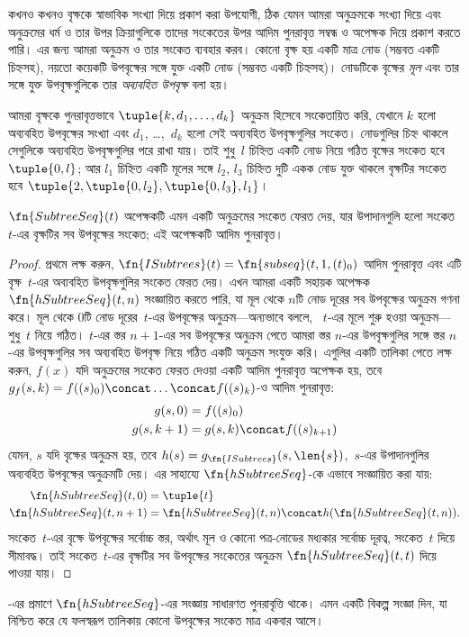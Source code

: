 \documentclass[../../../include/open-logic-section]{subfiles}
\begin{document}

কখনও কখনও বৃক্ষকে স্বাভাবিক সংখ্যা দিয়ে প্রকাশ করা উপযোগী, ঠিক যেমন
আমরা অনুক্রমকে সংখ্যা দিয়ে এবং অনুক্রমের ধর্ম ও তার উপর ক্রিয়াগুলিকে
তাদের সংকেতের উপর আদিম পুনরাবৃত্ত সম্বন্ধ ও অপেক্ষক দিয়ে প্রকাশ করতে
পারি। এর জন্য আমরা অনুক্রম ও তার সংকেত ব্যবহার করব। কোনো বৃক্ষ হয় একটি
মাত্র নোড (সম্ভবত একটি চিহ্নসহ), নয়তো কয়েকটি উপবৃক্ষের সঙ্গে যুক্ত একটি
নোড (সম্ভবত একটি চিহ্নসহ)। নোডটিকে বৃক্ষের \emph{মূল} এবং তার সঙ্গে যুক্ত
উপবৃক্ষগুলিকে তার \emph{অব্যবহিত উপবৃক্ষ} বলা হয়।

আমরা বৃক্ষকে পুনরাবৃত্তভাবে $\tuple{k, d_1, \dots, d_k}$ অনুক্রম হিসেবে
সংকেতায়িত করি, যেখানে $k$ হলো অব্যবহিত উপবৃক্ষের সংখ্যা এবং $d_1$,
\dots,~$d_k$ হলো সেই অব্যবহিত উপবৃক্ষগুলির সংকেত। নোডগুলির চিহ্ন থাকলে
সেগুলিকে অব্যবহিত উপবৃক্ষগুলির পরে রাখা যায়। তাই শুধু~$l$ চিহ্নিত একটি
নোড নিয়ে গঠিত বৃক্ষের সংকেত হবে $\tuple{0,l}$; আর $l_1$ চিহ্নিত একটি
মূলের সঙ্গে $l_2$, $l_3$ চিহ্নিত দুটি একক নোড যুক্ত থাকলে বৃক্ষটির সংকেত
হবে $\tuple{2, \tuple{0, l_2}, \tuple{0, l_3}, l_1}$।

\begin{prop}
  $\fn{SubtreeSeq}(t)$ অপেক্ষকটি এমন একটি অনুক্রমের সংকেত ফেরত দেয়,
  যার উপাদানগুলি হলো সংকেত~$t$-এর বৃক্ষটির সব উপবৃক্ষের সংকেত; এই
  অপেক্ষকটি আদিম পুনরাবৃত্ত।
\end{prop}

\begin{proof}
  প্রথমে লক্ষ করুন, $\fn{ISubtrees}(t) = \fn{subseq}(t, 1, (t)_0)$
  আদিম পুনরাবৃত্ত এবং এটি বৃক্ষ~$t$-এর অব্যবহিত উপবৃক্ষগুলির সংকেত ফেরত
  দেয়। এখন আমরা একটি সহায়ক অপেক্ষক $\fn{hSubtreeSeq}(t,n)$ সংজ্ঞায়িত
  করতে পারি, যা মূল থেকে $n$টি নোড দূরের সব উপবৃক্ষের অনুক্রম গণনা করে।
  মূল থেকে $0$টি নোড দূরের~$t$-এর উপবৃক্ষের অনুক্রম—অন্যভাবে বললে,
  ~$t$-এর মূলে শুরু হওয়া অনুক্রম—শুধু~$t$ নিয়ে গঠিত। $t$-এর স্তর
  $n+1$-এর সব উপবৃক্ষের অনুক্রম পেতে আমরা স্তর $n$-এর উপবৃক্ষগুলির
  সঙ্গে স্তর $n$-এর উপবৃক্ষগুলির সব অব্যবহিত উপবৃক্ষ নিয়ে গঠিত একটি
  অনুক্রম সংযুক্ত করি। এগুলির একটি তালিকা পেতে লক্ষ করুন, $f(x)$ যদি
  অনুক্রমের সংকেত ফেরত দেওয়া একটি আদিম পুনরাবৃত্ত অপেক্ষক হয়, তবে
  $g_f(s, k) = f((s)_0) \concat \dots \concat f((s)_k)$-ও আদিম
  পুনরাবৃত্ত:
    \begin{align*}
      g(s, 0) & = f((s)_0)\\
      g(s, k+1) & = g(s, k) \concat f((s)_{k+1})
    \end{align*}
    যেমন, $s$ যদি বৃক্ষের অনুক্রম হয়, তবে $h(s) =
    g_{\fn{ISubtrees}}(s, \len{s})$,~$s$-এর উপাদানগুলির অব্যবহিত
    উপবৃক্ষের অনুক্রমটি দেয়। এর সাহায্যে $\fn{hSubtreeSeq}$-কে
    এভাবে সংজ্ঞায়িত করা যায়:
    \begin{align*}
      \fn{hSubtreeSeq}(t, 0) & = \tuple{t} \\
      \fn{hSubtreeSeq}(t, n+1) & = \fn{hSubtreeSeq}(t, n) \concat
      h(\fn{hSubtreeSeq}(t, n)).
    \end{align*}
    সংকেত~$t$-এর বৃক্ষে উপবৃক্ষের সর্বোচ্চ স্তর, অর্থাৎ মূল ও কোনো
    পত্র-নোডের মধ্যকার সর্বোচ্চ দূরত্ব, সংকেত~$t$ দিয়ে সীমাবদ্ধ। তাই
    সংকেত~$t$-এর বৃক্ষটির সব উপবৃক্ষের সংকেতের অনুক্রম
    $\fn{hSubtreeSeq}(t, t)$ দিয়ে পাওয়া যায়।
\end{proof}

\begin{prob}
  -এর প্রমাণে
  $\fn{hSubtreeSeq}$-এর সংজ্ঞায় সাধারণত পুনরাবৃত্তি থাকে। এমন একটি
  বিকল্প সংজ্ঞা দিন, যা নিশ্চিত করে যে ফলস্বরূপ তালিকায় কোনো উপবৃক্ষের
  সংকেত মাত্র একবার আসে।
\end{prob}
\end{document}
